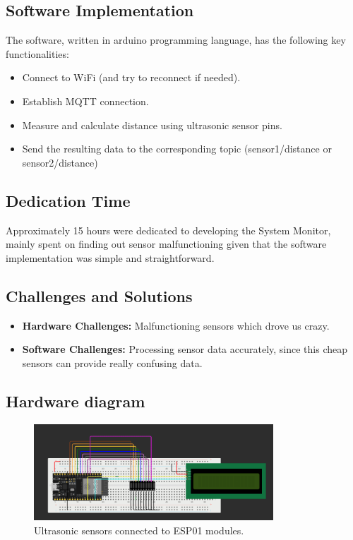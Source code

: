 \documentclass{article}
\begin{document}
\subsection{Software Implementation}
The software, written in arduino programming language, has the following key functionalities:
\begin{itemize}
    \item Connect to WiFi (and try to reconnect if needed).
    \item Establish MQTT connection.
    \item Measure and calculate distance using ultrasonic sensor pins.
    \item Send the resulting data to the corresponding topic (sensor1/distance or sensor2/distance)
\end{itemize}

\subsection{Dedication Time}
Approximately 15 hours were dedicated to developing the System Monitor, mainly spent on finding out sensor malfunctioning given that the software implementation was simple and straightforward.

\subsection{Challenges and Solutions}
\begin{itemize}
    \item \textbf{Hardware Challenges:} Malfunctioning sensors which drove us crazy.
    \item \textbf{Software Challenges:} Processing sensor data accurately, since this cheap sensors can provide really confusing data.
\end{itemize}

\subsection{Hardware diagram}
\begin{figure}[ht]
    \centering
    \includegraphics[width=0.8\textwidth]{../images/activity_monitor_scheme.png}
    \caption{Ultrasonic sensors connected to ESP01 modules.}
    \label{fig:esp32_system_monitor}
\end{figure}
\end{document}
